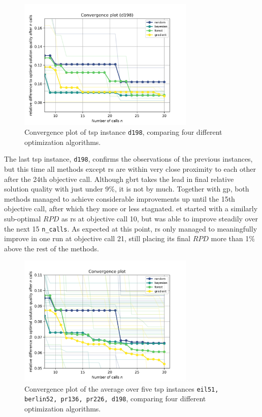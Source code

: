 \begin{figure}[h]
	\centering
	\includegraphics[width=0.75\textwidth]{results/part1/convergence_d198.png}
	\caption[Convergence plot of \gls{tsp} instance \texttt{d198}]{Convergence plot of \gls{tsp} instance \texttt{d198}, comparing four different optimization algorithms.}
	\label{fig:convergence_d198}
\end{figure}

The last \gls{tsp} instance, \texttt{d198}, confirms the observations of the previous instances, but this time all methods except \gls{rs} are within very close proximity to each other after the 24th objective call. Although \gls{gbrt} takes the lead in final relative solution quality with just under 9\%, it is not by much. Together with \gls{gp}, both methods managed to achieve considerable improvements up until the 15th objective call, after which they more or less stagnated. \gls{et} started with a similarly sub-optimal $RPD$ as \gls{rs} at objective call 10, but was able to improve steadily over the next 15 \texttt{n\_calls}. As expected at this point, \gls{rs} only managed to meaningfully improve in one run at objective call 21, still placing its final $RPD$ more than 1\% above the rest of the methods.

\begin{figure}[h]
	\centering
	\includegraphics[width=0.75\textwidth]{results/part1/convergence_all.png}
	\caption[Convergence plot of the average over five \gls{tsp} instances]{Convergence plot of the average over five \gls{tsp} instances \texttt{eil51, berlin52, pr136, pr226, d198}, comparing four different optimization algorithms.}
	\label{fig:convergence_all}
\end{figure}

